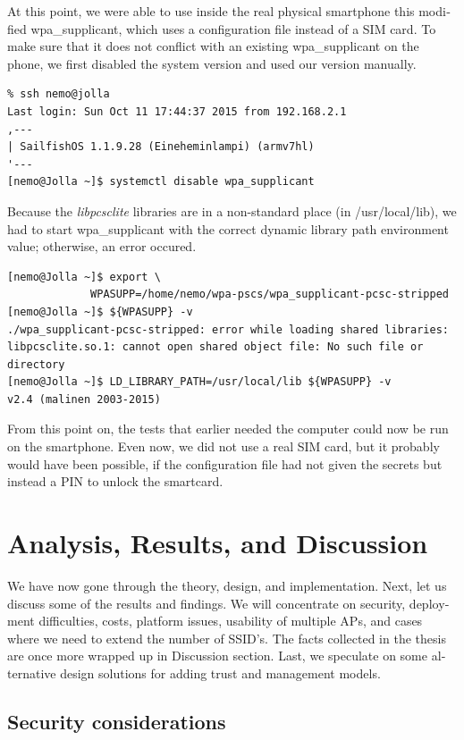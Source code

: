 \documentclass[12pt,a4paper,english]{tutthesis}
\begin{document}
\begin{otherlanguage}{english}
At this point, we were able to use inside the real physical smartphone this modified
wpa\_supplicant, which uses  a configuration file instead of a SIM card.  To make
sure that it does not conflict with an existing wpa\_supplicant on the phone,
we first disabled the system version and used our version manually.

\begin{verbatim}
% ssh nemo@jolla
Last login: Sun Oct 11 17:44:37 2015 from 192.168.2.1
,---
| SailfishOS 1.1.9.28 (Eineheminlampi) (armv7hl)
'---
[nemo@Jolla ~]$ systemctl disable wpa_supplicant
\end{verbatim}

Because the \emph{libpcsclite} libraries are in a non-standard
place (in /usr/local/lib), we had to start wpa\_supplicant with the
correct dynamic library path environment value; otherwise, an error occured.


\begin{verbatim}
[nemo@Jolla ~]$ export \
             WPASUPP=/home/nemo/wpa-pscs/wpa_supplicant-pcsc-stripped
[nemo@Jolla ~]$ ${WPASUPP} -v
./wpa_supplicant-pcsc-stripped: error while loading shared libraries:
libpcsclite.so.1: cannot open shared object file: No such file or 
directory
[nemo@Jolla ~]$ LD_LIBRARY_PATH=/usr/local/lib ${WPASUPP} -v
v2.4 (malinen 2003-2015)
\end{verbatim}
From this point on, the  tests that earlier needed the computer could now be run on the smartphone. Even now, we did not use a real SIM card, but it
probably would have been possible, if the configuration file had not
given the secrets but instead a PIN to unlock the smartcard.

\chapter{Analysis, Results, and Discussion}
\label{sec-6}

We have now gone through the theory, design, and implementation. Next,
let us
discuss some of the results and findings. We will concentrate on security, 
deployment difficulties, costs, platform issues, usability of multiple
APs, and cases where we
need to extend the number of SSID's. The facts collected in the thesis
are once more wrapped up in Discussion section.
Last, we speculate on some alternative design solutions for adding
trust and management models.


\section{Security considerations}
\label{sec-6-1}




\end{otherlanguage}
\end{document}
